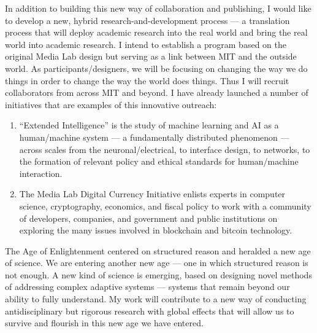 In addition to building this new way of collaboration and publishing, I would like to develop a new, hybrid research-and-development process --- a translation process that will deploy academic research into the real world and bring the real world into academic research. I intend to establish a program based on the original Media Lab design but serving as a link between MIT and the outside world. As participants/designers, we will be focusing on changing the way we do things in order to change the way the world does things. Thus I will recruit collaborators from across MIT and beyond. I have already launched a number of initiatives that are examples of this innovative outreach: 	

\begin{enumerate}
\item ``Extended Intelligence'' is the study of machine learning and AI as a human/machine system --- a fundamentally distributed phenomenon --- across scales from the neuronal/electrical, to interface design, to networks, to the formation of relevant policy and ethical standards for human/machine interaction.
	
\item The Media Lab Digital Currency Initiative enlists experts in computer science, cryptography, economics, and fiscal policy to work with a community of developers, companies, and government and public institutions on exploring the many issues involved in blockchain and bitcoin technology.
\end{enumerate}
	
The Age of Enlightenment centered on structured reason and heralded a new age of science. We are entering another new age --- one in which structured reason is not enough. A new kind of science is emerging, based on designing novel methods of addressing complex adaptive systems --- systems that remain beyond our ability to fully understand. My work will contribute to a new way of conducting antidisciplinary but rigorous research with global effects that will allow us to survive and flourish in this new age we have entered.
